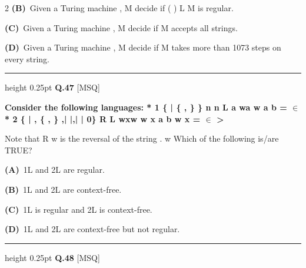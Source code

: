 \documentclass[a4paper,10pt,twoside]{article}
\begin{document}
\begin{multicols}{2}
\textbf{(B)}~Given a Turing machine \newline , \newline M decide if ( \newline ) \newline L M is regular.\par\vspace{2pt}\noindent
\textbf{(C)}~Given a Turing machine \newline , \newline M decide if M accepts all strings.\par\vspace{2pt}\noindent
\textbf{(D)}~Given a Turing machine \newline , \newline M decide if M takes more than 1073 steps on every \newline string.
\par\vspace{6pt}\hrule height 0.25pt\vspace{6pt}
\noindent\textbf{Q.47} \hfill {\footnotesize\textsf{[MSQ]}}
\par\vspace{2pt}
{\bfseries Consider the following languages:
*
1
\{
|
\{ , \} \}
n
n
L
a wa
w
a b
=
$\in$
*
2
\{
|
,
\{ , \} ,|
|,|
| 0\}
R
L
wxw
w x
a b
w
x
=
$\in$
>
\par\smallskip
Note that
R
w is the reversal of the string .
w Which of the following is/are TRUE? \par}
\par\vspace{2pt}\noindent
\textbf{(A)}~1L and \newline 2L are regular.\par\vspace{2pt}\noindent
\textbf{(B)}~1L and \newline 2L are context-free.\par\vspace{2pt}\noindent
\textbf{(C)}~1L is regular and \newline 2L is context-free.\par\vspace{2pt}\noindent
\textbf{(D)}~1L and \newline 2L are context-free but not regular.
\par\vspace{6pt}\hrule height 0.25pt\vspace{6pt}
\noindent\textbf{Q.48} \hfill {\footnotesize\textsf{[MSQ]}}
\par\vspace{2pt}

\end{multicols}
\end{document}
